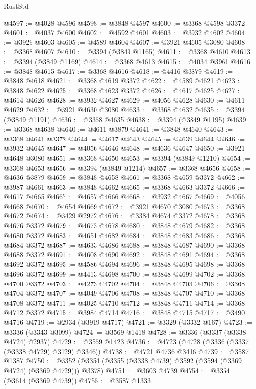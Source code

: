 \begin{lexlean}{RustStd}
\begin{coremodule}
@4597 := @4028 @4596
@4598 := @3848 @4597
@4600 := @3368 @4598 @3372
@4601 := @4037 @4600
@4602 := @4592 @4601
@4603 := @3932 @4602
@4604 := @3929 @4603
@4605 := @4589 @4604
@4607 := @3921 @4605 @3080
@4608 := @3368 @4607
@4610 := @3394 (@3849 @1165)
@4611 := @3368 @4610
@4613 := @3394 (@3849 @1169)
@4614 := @3368 @4613
@4615 := @4034 @3961
@4616 := @3848 @4615
@4617 := @3368 @4616
@4618 := @4416 @3879
@4619 := @3848 @4618
@4621 := @3368 @4619 @3372
@4622 := @4589 @4621
@4623 := @3848 @4622
@4625 := @3368 @4623 @3372
@4626 := @4617 @4625
@4627 := @4614 @4626
@4628 := @3932 @4627
@4629 := @4056 @4628
@4630 := @4611 @4629
@4632 := @3921 @4630 @3080
@4633 := @3368 @4632
@4635 := @3394 (@3849 @1191)
@4636 := @3368 @4635
@4638 := @3394 (@3849 @1195)
@4639 := @3368 @4638
@4640 := @4611 @3879
@4641 := @3848 @4640
@4643 := @3368 @4641 @3372
@4644 := @4617 @4643
@4645 := @4639 @4644
@4646 := @3932 @4645
@4647 := @4056 @4646
@4648 := @4636 @4647
@4650 := @3921 @4648 @3080
@4651 := @3368 @4650
@4653 := @3394 (@3849 @1210)
@4654 := @3368 @4653
@4656 := @3394 (@3849 @1214)
@4657 := @3368 @4656
@4658 := @4636 @3879
@4659 := @3848 @4658
@4661 := @3368 @4659 @3372
@4662 := @3987 @4661
@4663 := @3848 @4662
@4665 := @3368 @4663 @3372
@4666 := @4617 @4665
@4667 := @4657 @4666
@4668 := @3932 @4667
@4669 := @4056 @4668
@4670 := @4654 @4669
@4672 := @3921 @4670 @3080
@4673 := @3368 @4672
@4674 := @3429 @2972
@4676 := @3384 @4674 @3372
@4678 := @3368 @4676 @3372
@4679 := @4673 @4678
@4680 := @3848 @4679
@4682 := @3368 @4680 @3372
@4683 := @4651 @4682
@4684 := @3848 @4683
@4686 := @3368 @4684 @3372
@4687 := @4633 @4686
@4688 := @3848 @4687
@4690 := @3368 @4688 @3372
@4691 := @4608 @4690
@4692 := @3848 @4691
@4694 := @3368 @4692 @3372
@4695 := @4586 @4694
@4696 := @3848 @4695
@4698 := @3368 @4696 @3372
@4699 := @4413 @4698
@4700 := @3848 @4699
@4702 := @3368 @4700 @3372
@4703 := @4273 @4702
@4704 := @3848 @4703
@4706 := @3368 @4704 @3372
@4707 := @4049 @4706
@4708 := @3848 @4707
@4710 := @3368 @4708 @3372
@4711 := @4025 @4710
@4712 := @3848 @4711
@4714 := @3368 @4712 @3372
@4715 := @3984 @4714
@4716 := @3848 @4715
@4717 := @3490 @4716
@4719 := @2934 (@3919 @4717)
@4721 := @3329 (@3332 @167)
@4723 := @3336 (@3343 @3099)
@4724 := @3569 @1418
@4728 := @3336 (@3337 (@3338 @4724) @2937)
@4729 := @3569 @1423
@4736 := @4723 (@4728 (@3336 (@3337 (@3338 @4729) @3129) @3346))
@4738 := @4721 @4736 @3416
@4739 := @3587 @1387
@4750 := @3352 (@3354 (@3355 (@3338 @4739) @3592 (@3594 (@3369 @4724) (@3369 @4729))) @3378)
@4751 := @3603 @4739
@4754 := @3354 (@3614 (@3369 @4739))
@4755 := @3587 @1333

\end{coremodule}
\end{lexlean}
